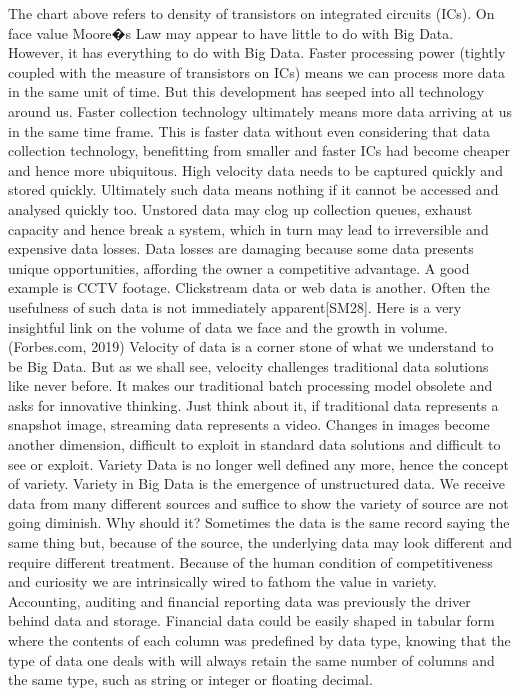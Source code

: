 \documentclass{book}
\begin{document}
The chart above refers to density of transistors on integrated circuits (ICs).  On face value Moore�s Law may appear to have little to do with Big Data.  However, it has everything to do with Big Data.  Faster processing power (tightly coupled with the measure of transistors on ICs) means we can process more data in the same unit of time.  But this development has seeped into all technology around us.  Faster collection technology ultimately means more data arriving at us in the same time frame.  This is faster data without even considering that data collection technology, benefitting from smaller and faster ICs had become cheaper and hence more ubiquitous.  High velocity data needs to be captured quickly and stored quickly.  Ultimately such data means nothing if it cannot be accessed and analysed quickly too. Unstored data may clog up collection queues, exhaust capacity and hence break a system, which in turn may lead to irreversible and expensive data losses. Data losses are damaging because some data presents unique opportunities, affording the owner a competitive advantage. A good example is CCTV footage. Clickstream data or web data is another.  Often the usefulness of such data is not immediately apparent[SM28].   
Here is a very insightful link on the volume of data we face and the growth in volume.
(Forbes.com, 2019)
Velocity of data is a corner stone of what we understand to be Big Data.  But as we shall see, velocity challenges traditional data solutions like never before.  It makes our traditional batch processing model obsolete and asks for innovative thinking.  Just think about it, if traditional data represents a snapshot image, streaming data represents a video.  Changes in images become another dimension, difficult to exploit in standard data solutions and difficult to see or exploit.
Variety
Data is no longer well defined any more, hence the concept of variety.  Variety in Big Data is the emergence of unstructured data.  We receive data from many different sources and suffice to show the variety of source are not going diminish.  Why should it? Sometimes the data is the same record saying the same thing but, because of the source, the underlying data may look different and require different treatment.  Because of the human condition of competitiveness and curiosity we are intrinsically wired to fathom the value in variety.  Accounting, auditing and financial reporting data was previously the driver behind data and storage.  Financial data could be easily shaped in tabular form where the contents of each column was predefined by data type, knowing that the type of data one deals with will always retain the same number of columns and the same type, such as string or integer or floating decimal.  
\end{document}
